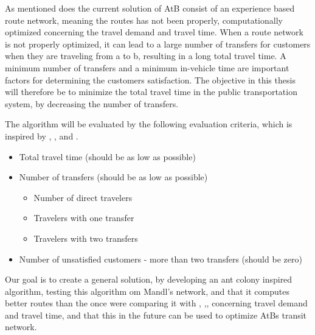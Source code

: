 As mentioned does %
the current solution of AtB \citep{website:atb} consist of an experience based route network, meaning the routes has not been properly, computationally optimized concerning the travel demand and travel time. When a route network is not properly optimized, it can lead to a large number of transfers for customers when they are traveling from a to b, resulting in a long total travel time. A minimum number of transfers and a minimum in-vehicle time are important factors for determining the customers satisfaction. The objective in this thesis will therefore be to minimize the total travel time in the public transportation system, by decreasing the number of transfers. %

The algorithm will be evaluated by the following evaluation criteria, which is inspired by \citep{kechagiopoulos14}, \citep{mandl80}, \citep{nikolic14} and \citep{fan09}.
\begin{itemize}
\item Total travel time (should be as low as possible)
\item Number of transfers (should be as low as possible)
\begin{itemize}
\item Number of direct travelers 
\item Travelers with one transfer
\item Travelers with two transfers
\end{itemize}
\item Number of unsatisfied customers - more than two transfers (should be zero)
\end{itemize}

Our goal is to create a general solution, by developing an ant colony inspired algorithm, testing this algorithm om Mandl's network, and that it computes better routes than the once were comparing it with \citep{kechagiopoulos14}, \citep{nikolic14},\citep{fan09}, concerning travel demand and travel time, and that this in the future can be used to optimize AtBs transit network. 





